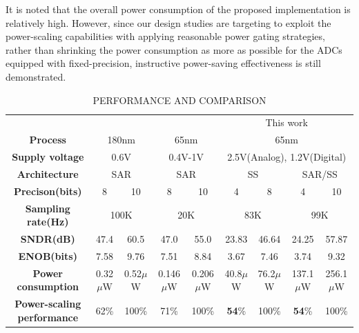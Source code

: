 It is noted that the overall power consumption of the proposed implementation is relatively high. However, since our design studies are targeting to exploit the power-scaling capabilities with applying reasonable power gating strategies, rather than shrinking the power consumption as more as possible for the ADCs equipped with fixed-precision, instructive power-saving effectiveness is still demonstrated.

\begin{table}[htbp]
	\caption{PERFORMANCE AND COMPARISON}
	\begin{center}
		\begin{tabular}{|c|c|c|c|c|c|c|c|c|}
			\hline
			\textbf{}& \multicolumn{2}{|c|}{\cite{zhu_6--10-bit_2015}} & \multicolumn{2}{|c|}{\cite{zhu_6--10-bit_2015}} & \multicolumn{4}{|c|}{This work} \\
			\hhline{|=========|}
			\textbf{Process}& \multicolumn{2}{|c|}{180nm} & \multicolumn{2}{|c|}{65nm} & \multicolumn{4}{|c|}{65nm} \\
			\hline 
			\textbf{Supply voltage}& \multicolumn{2}{|c|}{0.6V} & \multicolumn{2}{|c|}{0.4V-1V} & \multicolumn{4}{|c|}{2.5V(Analog), 1.2V(Digital)} \\
			\hline
			
			\textbf{Architecture}& \multicolumn{2}{|c|}{SAR} & \multicolumn{2}{|c|}{SAR} & \multicolumn{2}{|c|}{SS} & \multicolumn{2}{|c|}{SAR/SS}\\
			\hline
			\textbf{Precison(bits)} & 8 & 10 & 8 & 10 & 4 & 8 & 4 & 10 \\
			\hline
			\textbf{Sampling rate(Hz)}& \multicolumn{2}{|c|}{100K} & \multicolumn{2}{|c|}{20K} & \multicolumn{2}{|c|}{83K} & \multicolumn{2}{|c|}{99K} \\
			\hline
			\textbf{SNDR(dB)} & 47.4 & 60.5 & 47.0 & 55.0 & 23.83 & 46.64 & 24.25 & 57.87 \\
			\hline
			\textbf{ENOB(bits)}& 7.58 & 9.76 & 7.51 & 8.84 & 3.67 & 7.46 & 3.74 & 9.32 \\
			\hline
			\textbf{Power consumption}& 0.32$\mu$W & 0.52$\mu$W &  0.146$\mu$W & 0.206$\mu$W & 40.8$\mu$W & 76.2$\mu$W & 137.1$\mu$W & 256.1$\mu$W\\
			\hline
			\textbf{Power-scaling performance}& 62\% & 100\% & 71\% & 100\% & \textbf{54}\% & 100\% & \textbf{54}\% & 100\% \\
			\hline
		\end{tabular}
		\label{tab1}
	\end{center}
\end{table}